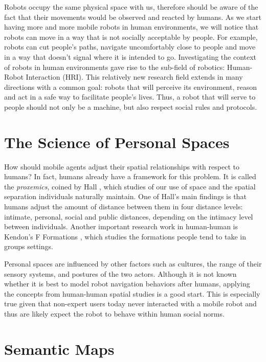 Robots occupy the same physical space with us, therefore should be aware of the fact that their movements would be observed and reacted by humans. As we start having more and more mobile robots in human environments, we will notice that robots can move in a way that is not socially acceptable by people. For example, robots can cut people's paths, navigate uncomfortably close to people and move in a way that doesn't signal where it is intended to go. Investigating the context of robots in human environments gave rise to the sub-field of robotics: Human-Robot Interaction (HRI). This relatively new research field extends in many directions with a common goal: robots that will perceive its environment, reason and act in a safe way to facilitate people's lives. Thus, a robot that will serve to people should not only be a machine, but also respect social rules and protocols.

\section{The Science of Personal Spaces}
\label{sec:personal_spaces}

How should mobile agents adjust their spatial relationships with respect to humans? In fact, humans already have a framework for this problem. It is called the \textit{proxemics}, coined by Hall \cite{hall1966hidden}, which studies of our use of space and the spatial separation individuals naturally maintain. One of Hall's main findings is that humans adjust the amount of distance between them in four distance levels: intimate, personal, social and public distances, depending on the intimacy level between individuals. Another important research work in human-human is Kendon's F Formations \cite{kendon1990conducting}, which studies the formations people tend to take in groups settings.

Personal spaces are influenced by other factors such as cultures, the range of their sensory systems, and postures of the two actors. Although it is not known whether it is best to model robot navigation behaviors after humans, applying the concepts from human-human spatial studies is a good start. This is especially true given that non-expert users today never interacted with a mobile robot and thus are likely expect the robot to behave within human social norms.

\section{Semantic Maps}
\label{sec:semantic_maps}

